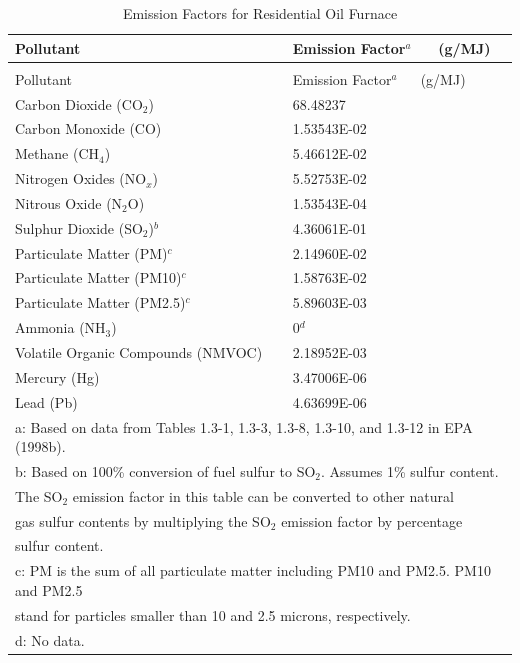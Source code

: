 \begin{longtable}[c]{p{4.5in}p{1.5in}}
\caption{Emission Factors for Residential Oil Furnace \label{table:emission-factors-for-residential-oil-furnace}} \tabularnewline
\toprule
Pollutant & Emission Factor\(^a\)  ~~ (g/MJ) \tabularnewline
\midrule
\endfirsthead

\caption[]{Emission Factors for Residential Oil Furnace} \tabularnewline
\toprule
Pollutant & Emission Factor\(^a\)  ~~ (g/MJ) \tabularnewline
\midrule
\endhead

Carbon Dioxide (CO\(_2\)) & 68.48237 \tabularnewline
Carbon Monoxide (CO) & 1.53543E-02 \tabularnewline
Methane (CH\(_4\)) & 5.46612E-02 \tabularnewline
Nitrogen Oxides (NO\(_x\)) & 5.52753E-02 \tabularnewline
Nitrous Oxide (N\(_2\)O) & 1.53543E-04 \tabularnewline
Sulphur Dioxide (SO\(_2\))\(^b\) & 4.36061E-01 \tabularnewline
Particulate Matter (PM)\(^c\) & 2.14960E-02 \tabularnewline
Particulate Matter (PM10)\(^c\) & 1.58763E-02 \tabularnewline
Particulate Matter (PM2.5)\(^c\) & 5.89603E-03 \tabularnewline
Ammonia (NH\(_3\)) & 0\(^d\) \tabularnewline
Volatile Organic Compounds (NMVOC) & 2.18952E-03 \tabularnewline
Mercury (Hg) & 3.47006E-06 \tabularnewline
Lead (Pb) & 4.63699E-06 \tabularnewline
\midrule
\multicolumn{2}{l}{a: Based on data from Tables 1.3-1, 1.3-3, 1.3-8, 1.3-10, and 1.3-12 in EPA (1998b).} \tabularnewline
\multicolumn{2}{l}{b: Based on 100\% conversion of fuel sulfur to SO\(_2\). Assumes 1\% sulfur content.} \tabularnewline
\multicolumn{2}{l}{The SO\(_2\) emission factor in this table can be converted to other natural} \tabularnewline
\multicolumn{2}{l}{gas sulfur contents by multiplying the SO\(_2\) emission factor by percentage} \tabularnewline
\multicolumn{2}{l}{sulfur content.} \tabularnewline
\multicolumn{2}{l}{c: PM is the sum of all particulate matter including PM10 and PM2.5. PM10 and PM2.5} \tabularnewline
\multicolumn{2}{l}{stand for particles smaller than 10 and 2.5 microns, respectively.} \tabularnewline
\multicolumn{2}{l}{d: No data.} \tabularnewline
\bottomrule
\end{longtable}


